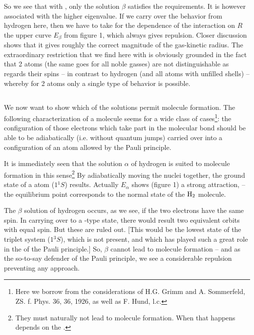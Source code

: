 \begin{paper}{1}
So we see that with , only the solution $\beta$ satisfies the requirements. It is however associated with the higher eigenvalue. If we carry over the behavior from hydrogen here, then we have to take for the dependence of the interaction on $R$ the upper curve $E_\beta$ from figure 1, which always gives repulsion. Closer discussion shows that it gives roughly the correct magnitude of the gas-kinetic  radius. The extraordinary restriction that we find here with  is obviously grounded in the fact that 2  atoms (the same goes for all noble gasses) are not distinguishable as regards their spins -- in contrast to hydrogen (and all atoms with unfilled shells) -- whereby for 2  atoms only a single type of behavior is possible.

\subsection{} We now want to show which of the  solutions permit molecule formation. The following characterization of a molecule seems  for a wide class of cases\footnote{Here we borrow from the considerations of H.G. Grimm and A. Sommerfeld, ZS. f. Phys. 36, 36, 1926, as well as F. Hund, l.c.}: the configuration of those electrons which take part in the molecular bond should be able to be adiabatically (i.e. without quantum jumps) carried over into a configuration of an atom allowed by the Pauli principle. 

It is immediately seen that the solution $\alpha$ of hydrogen is suited to molecule formation in this sense\footnote{They must naturally not lead to molecule formation. When that happens depends on the .} By adiabatically moving the nuclei together, the ground state of a  atom ($1 {{}^1 S}$) results. Actually $E_\alpha$ shows (figure 1) a strong attraction, -- the equilibrium point corresponds to the normal state of the $\text{H}_2$ molecule.

The $\beta$ solution of hydrogen occurs, as we see, if the two electrons have the same spin. In carrying over to a -type state, there would result two equivalent orbits with equal spin. But these are ruled out. [This would be the lowest state of the triplet system ($1{{}^3 S}$), which is not present, and which has played such a great role in the  of the Pauli principle.] So, $\beta$ cannot lead to molecule formation -- and as the so-to-say defender of the Pauli principle, we see a considerable repulsion preventing any approach.


\end{paper}
